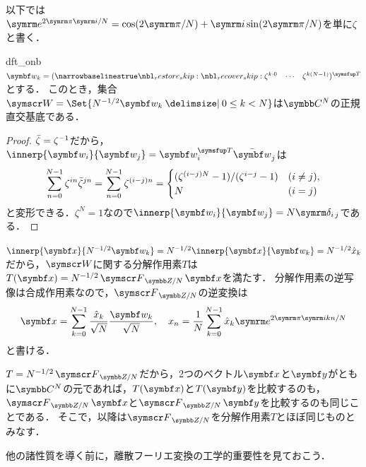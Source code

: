 \documentclass[../../main]{subfiles}
\begin{document}
以下では\(\napr^{2\krez\iuni/N}=\cos(2\krez/N)+\iuni\sin(2\krez/N)\)を単に\(\zeta\)と書く．

\begin{proposition}{}{dft_onb}
  \(\vect{w}_k=\trps{\rowvect{\zeta^{k\cdot 0} & \cdots & \zeta^{k(N-1)}}}\)とする．
  このとき，集合\(\basis{W}=\Set{N^{-1/2}\vect{w}_k\given 0\leq k<N}\)は\(\numset{C}^N\)の正規直交基底である．
\end{proposition}

\begin{proof}
  \(\conj{\zeta}=\zeta^{-1}\)だから，\(\innerp{\vect{w}_i}{\vect{w}_j}=\trps{\vect{w}_i}\conj{\vect{w}}_j\)は
  \[
    \sum_{n=0}^{N-1}\zeta^{in}\conj{\zeta}^{jn} = \sum_{n=0}^{N-1}\zeta^{(i-j)n}
    = \begin{cases}(\zeta^{(i-j)N}-1)/(\zeta^{i-j}-1) & (i\neq j), \\ N & (i=j)\end{cases}
  \]
  と変形できる．\(\zeta^N=1\)なので\(\innerp{\vect{w}_i}{\vect{w}_j}=N\kdelta{i}{j}\)である．
\end{proof}

\(\innerp{\vect{x}}{N^{-1/2}\vect{w}_k}=N^{-1/2}\innerp{\vect{x}}{\vect{w}_k}=N^{-1/2}\hat{x}_k\)だから，\(\basis{W}\)に関する分解作用素\(T\)は\(T(\vect{x})=N^{-1/2}\dft{N}\vect{x}\)を満たす．
分解作用素の逆写像は合成作用素なので，\(\dft{N}\)の逆変換は
\begin{equation}
  \label{equation:idft}
  \vect{x} = \sum_{k=0}^{N-1}\frac{\hat{x}_k}{\sqrt{N}}\frac{\vect{w}_k}{\sqrt{N}},
  \quad x_n = \frac{1}{N}\sum_{k=0}^{N-1}\hat{x}_k\napr^{2\krez\iuni kn/N}
\end{equation}
と書ける．

\begin{note}
  \(T=N^{-1/2}\dft{N}\)だから，2つのベクトル\(\vect{x}\)と\(\vect{y}\)がともに\(\numset{C}^N\)の元であれば，\(T(\vect{x})\)と\(T(\vect{y})\)を比較するのも，\(\dft{N}\vect{x}\)と\(\dft{N}\vect{y}\)を比較するのも同じことである．
  そこで，以降は\(\dft{N}\)を分解作用素\(T\)とほぼ同じものとみなす．
\end{note}

他の諸性質を導く前に，離散フーリエ変換の工学的重要性を見ておこう．
\end{document}
